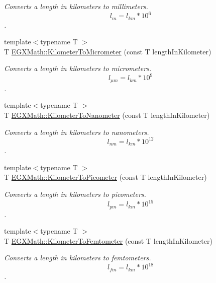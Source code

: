 \begin{DoxyCompactItemize}
\begin{DoxyCompactList}\small\item\em Converts a length in kilometers to millimeters. \[ l_{m}=l_{km} * 10^{6} \]. \end{DoxyCompactList}\item 
{\footnotesize template$<$typename T $>$ }\\T \mbox{\hyperlink{group___e_g_x_math-_conversions-_length_conversions-_kilometer-_s_i_ga345d16c72fcb96ff1dc3b7f290b94c94}{E\+G\+X\+Math\+::\+Kilometer\+To\+Micrometer}} (const T length\+In\+Kilometer)
\begin{DoxyCompactList}\small\item\em Converts a length in kilometers to micrometers. \[ l_{\mu m}=l_{km} * 10^{9} \]. \end{DoxyCompactList}\item 
{\footnotesize template$<$typename T $>$ }\\T \mbox{\hyperlink{group___e_g_x_math-_conversions-_length_conversions-_kilometer-_s_i_gaa2272319841906222fd95dc1c3e90549}{E\+G\+X\+Math\+::\+Kilometer\+To\+Nanometer}} (const T length\+In\+Kilometer)
\begin{DoxyCompactList}\small\item\em Converts a length in kilometers to nanometers. \[ l_{nm}=l_{km} * 10^{12} \]. \end{DoxyCompactList}\item 
{\footnotesize template$<$typename T $>$ }\\T \mbox{\hyperlink{group___e_g_x_math-_conversions-_length_conversions-_kilometer-_s_i_ga73f6e033de3c41892f06cde1862f68d6}{E\+G\+X\+Math\+::\+Kilometer\+To\+Picometer}} (const T length\+In\+Kilometer)
\begin{DoxyCompactList}\small\item\em Converts a length in kilometers to picometers. \[ l_{pm}=l_{km} * 10^{15} \]. \end{DoxyCompactList}\item 
{\footnotesize template$<$typename T $>$ }\\T \mbox{\hyperlink{group___e_g_x_math-_conversions-_length_conversions-_kilometer-_s_i_ga74e9c4726fddf2091c1d687e7c5f4b37}{E\+G\+X\+Math\+::\+Kilometer\+To\+Femtometer}} (const T length\+In\+Kilometer)
\begin{DoxyCompactList}\small\item\em Converts a length in kilometers to femtometers. \[ l_{fm}=l_{km} * 10^{18} \]. \end{DoxyCompactList}\item 

\end{DoxyCompactItemize}

